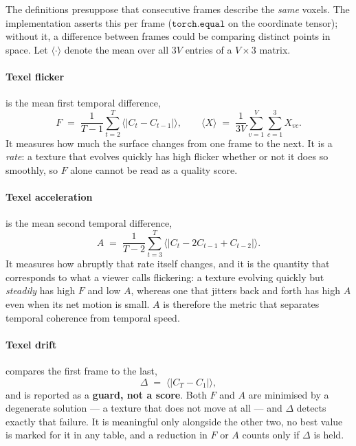 The definitions presuppose that consecutive frames describe the \emph{same} voxels.
The implementation asserts this per frame ($\texttt{torch.equal}$ on the coordinate
tensor); without it, a difference between frames could be comparing distinct points
in space. Let $\langle \cdot \rangle$ denote the mean over all $3V$ entries of a
$V \times 3$ matrix.

\paragraph{Texel flicker} is the mean first temporal difference,
\begin{equation}
  F \;=\; \frac{1}{T-1}\sum_{t=2}^{T}
          \Big\langle \big| C_t - C_{t-1} \big| \Big\rangle ,
  \qquad
  \big\langle X \big\rangle \;=\; \frac{1}{3V}\sum_{v=1}^{V}\sum_{c=1}^{3} X_{vc}.
  \label{eq:flicker}
\end{equation}
It measures how much the surface changes from one frame to the next. It is a
\emph{rate}: a texture that evolves quickly has high flicker whether or not it does
so smoothly, so $F$ alone cannot be read as a quality score.

\paragraph{Texel acceleration} is the mean second temporal difference,
\begin{equation}
  A \;=\; \frac{1}{T-2}\sum_{t=3}^{T}
          \Big\langle \big| C_t - 2C_{t-1} + C_{t-2} \big| \Big\rangle .
  \label{eq:accel}
\end{equation}
It measures how abruptly that rate itself changes, and it is the quantity that
corresponds to what a viewer calls flickering: a texture evolving quickly but
\emph{steadily} has high $F$ and low $A$, whereas one that jitters back and forth has
high $A$ even when its net motion is small. $A$ is therefore the metric that separates
temporal coherence from temporal speed.

\paragraph{Texel drift} compares the first frame to the last,
\begin{equation}
  \Delta \;=\; \Big\langle \big| C_T - C_1 \big| \Big\rangle ,
  \label{eq:drift}
\end{equation}
and is reported as a \textbf{guard, not a score}. Both $F$ and $A$ are minimised by a
degenerate solution --- a texture that does not move at all --- and $\Delta$ detects
exactly that failure. It is meaningful only alongside the other two, no best value is
marked for it in any table, and a reduction in $F$ or $A$ counts only if $\Delta$ is
held.

